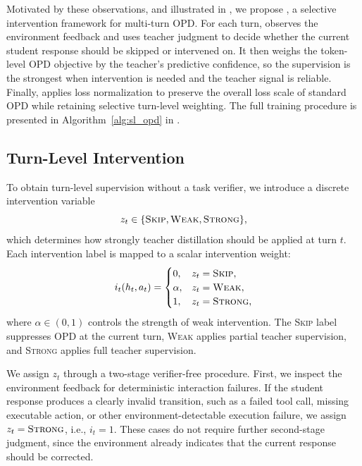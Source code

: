 Motivated by these observations, and illustrated in , we propose \ours, a selective intervention framework for multi-turn OPD.
%
For each turn, \ours{} observes the environment feedback and uses teacher judgment to decide whether the current student response should be skipped or intervened on.
%
It then weighs the token-level OPD objective by the teacher's predictive confidence, so the supervision is the strongest when intervention is needed and the teacher signal is reliable.
%
Finally, \ours{} applies loss normalization to preserve the overall loss scale of standard OPD while retaining selective turn-level weighting.
%
The full training procedure is presented in Algorithm~\ref{alg:sl_opd} in .
%


\subsection{Turn-Level Intervention}
\label{sec:method_intervention}
To obtain turn-level supervision without a task verifier, we introduce a discrete intervention variable
\begin{equation}
    z_t \in \{\textsc{Skip}, \textsc{Weak}, \textsc{Strong}\},
    \label{eq:intervention_labels}
\end{equation}
which determines how strongly teacher distillation should be applied at turn $t$. 
%
Each intervention label is mapped to a scalar intervention weight:
\begin{equation}
    i_t (h_t, a_t) =
    \begin{cases}
        0, & z_t = \textsc{Skip}, \\
        \alpha, & z_t = \textsc{Weak}, \\
        1, & z_t = \textsc{Strong},
    \end{cases}
    \label{eq:mapping}
\end{equation}
where $\alpha \in (0,1)$ controls the strength of weak intervention. 
%
The \textsc{Skip} label suppresses OPD at the current turn, \textsc{Weak} applies partial teacher supervision, and \textsc{Strong} applies full teacher supervision.
%

We assign $z_t$ through a two-stage verifier-free procedure.
%
First, we inspect the environment feedback for deterministic interaction failures. 
%
If the student response produces a clearly invalid transition, such as a failed tool call, missing executable action, or other environment-detectable execution failure, we assign
$z_t = \textsc{Strong}$, i.e., $i_t = 1$.
These cases do not require 
further second-stage judgment,
since the environment already indicates that the current response should be corrected.
%


